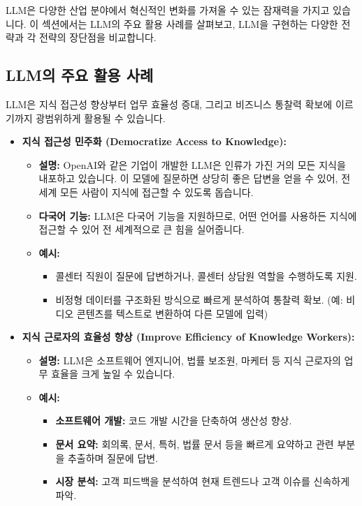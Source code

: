 \documentclass[11pt,a4paper]{article}
\theoremstyle{definition}
\begin{document}
LLM은 다양한 산업 분야에서 혁신적인 변화를 가져올 수 있는 잠재력을 가지고 있습니다. 이 섹션에서는 LLM의 주요 활용 사례를 살펴보고, LLM을 구현하는 다양한 전략과 각 전략의 장단점을 비교합니다.

\subsection{LLM의 주요 활용 사례}

LLM은 지식 접근성 향상부터 업무 효율성 증대, 그리고 비즈니스 통찰력 확보에 이르기까지 광범위하게 활용될 수 있습니다.

\begin{itemize}
    \item \textbf{지식 접근성 민주화 (Democratize Access to Knowledge):}
    \begin{itemize}
        \item \textbf{설명:} OpenAI와 같은 기업이 개발한 LLM은 인류가 가진 거의 모든 지식을 내포하고 있습니다. 이 모델에 질문하면 상당히 좋은 답변을 얻을 수 있어, 전 세계 모든 사람이 지식에 접근할 수 있도록 돕습니다.
        \item \textbf{다국어 기능:} LLM은 다국어 기능을 지원하므로, 어떤 언어를 사용하든 지식에 접근할 수 있어 전 세계적으로 큰 힘을 실어줍니다.
        \item \textbf{예시:}
        \begin{itemize}
            \item 콜센터 직원이 질문에 답변하거나, 콜센터 상담원 역할을 수행하도록 지원.
            \item 비정형 데이터를 구조화된 방식으로 빠르게 분석하여 통찰력 확보. (예: 비디오 콘텐츠를 텍스트로 변환하여 다른 모델에 입력)
        \end{itemize}
    \end{itemize}

    \item \textbf{지식 근로자의 효율성 향상 (Improve Efficiency of Knowledge Workers):}
    \begin{itemize}
        \item \textbf{설명:} LLM은 소프트웨어 엔지니어, 법률 보조원, 마케터 등 지식 근로자의 업무 효율을 크게 높일 수 있습니다.
        \item \textbf{예시:}
        \begin{itemize}
            \item \textbf{소프트웨어 개발:} 코드 개발 시간을 단축하여 생산성 향상.
            \item \textbf{문서 요약:} 회의록, 문서, 특허, 법률 문서 등을 빠르게 요약하고 관련 부분을 추출하며 질문에 답변.
            \item \textbf{시장 분석:} 고객 피드백을 분석하여 현재 트렌드나 고객 이슈를 신속하게 파악.
        \end{itemize}
    \end{itemize}


\end{itemize}
\end{document}
